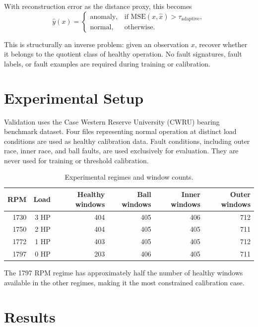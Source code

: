 \documentclass[11pt]{article}
\newcommand{\tauadapt}{\tau_{\mathrm{adaptive}}}
\begin{document}
With reconstruction error as the distance proxy, this becomes
\begin{equation}
\hat{y}(x) =
\begin{cases}
\mathrm{anomaly}, & \text{if } \mathrm{MSE}(x,\hat{x}) > \tauadapt,\\
\mathrm{normal}, & \text{otherwise.}
\end{cases}
\end{equation}

This is structurally an inverse problem: given an observation $x$, recover whether it belongs to the quotient class of healthy operation. No fault signatures, fault labels, or fault examples are required during training or calibration.

\section{Experimental Setup}

Validation uses the Case Western Reserve University (CWRU) bearing benchmark dataset. Four files representing normal operation at distinct load conditions are used as healthy calibration data. Fault conditions, including outer race, inner race, and ball faults, are used exclusively for evaluation. They are never used for training or threshold calibration.

\begin{table}[H]
\centering
\caption{Experimental regimes and window counts.}
\label{tab:experimental_setup}
\begin{tabular}{rrrrrr}
\toprule
RPM & Load & Healthy windows & Ball windows & Inner windows & Outer windows \\
\midrule
1730 & 3 HP & 404 & 405 & 406 & 712 \\
1750 & 2 HP & 404 & 405 & 405 & 711 \\
1772 & 1 HP & 403 & 405 & 405 & 712 \\
1797 & 0 HP & 203 & 406 & 405 & 711 \\
\bottomrule
\end{tabular}
\end{table}

The 1797 RPM regime has approximately half the number of healthy windows available in the other regimes, making it the most constrained calibration case.

\section{Results}
\end{document}
